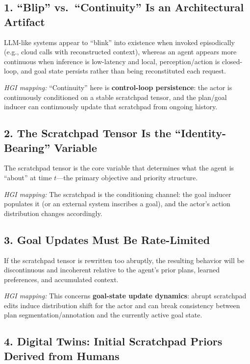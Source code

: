 \documentclass[12pt, a4paper]{article}
\begin{document}
\subsection*{1. ``Blip'' vs.\ ``Continuity'' Is an Architectural Artifact}

LLM-like systems appear to ``blink'' into existence when invoked episodically (e.g., cloud calls with reconstructed context), whereas an agent appears more continuous when inference is low-latency and local, perception/action is closed-loop, and goal state persists rather than being reconstituted each request.

\textit{HGI mapping:} ``Continuity'' here is \textbf{control-loop persistence}: the actor is continuously conditioned on a stable scratchpad tensor, and the plan/goal inducer can continuously update that scratchpad from ongoing history.

\subsection*{2. The Scratchpad Tensor Is the ``Identity-Bearing'' Variable}

The scratchpad tensor is the core variable that determines what the agent is ``about'' at time $t$---the primary objective and priority structure.

\textit{HGI mapping:} The scratchpad is the conditioning channel: the goal inducer populates it (or an external system inscribes a goal), and the actor's action distribution changes accordingly.

\subsection*{3. Goal Updates Must Be Rate-Limited}

If the scratchpad tensor is rewritten too abruptly, the resulting behavior will be discontinuous and incoherent relative to the agent's prior plans, learned preferences, and accumulated context.

\textit{HGI mapping:} This concerns \textbf{goal-state update dynamics}: abrupt scratchpad edits induce distribution shift for the actor and can break consistency between plan segmentation/annotation and the currently active goal state.

\subsection*{4. Digital Twins: Initial Scratchpad Priors Derived from Humans}
\end{document}
